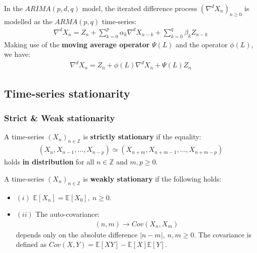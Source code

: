 \begin{definition}
    In the $ARIMA(p, d, q)$ model, the iterated difference process $(\nabla^dX_n)_{n\ge0}$ is modelled as the $ARMA(p, q)$ time-series:
    \begin{align*}
    \boxed{
        \nabla^d X_n = Z_n + \sum_{k=0}^p \alpha_k \nabla^dX_{n-k} + \sum_{k=0}^q \beta_k Z_{n-k}
    }
    \end{align*}
    \noindent Making use of the \textbf{moving average operator} $\Psi(L)$ and the operator $\phi(L)$, we have:
    \begin{align*}
        \boxed{
            \nabla^d X_n = Z_n + \phi(L)\nabla^dX_n + \Psi(L) Z_n
        }
    \end{align*}
\end{definition}

\subsection{Time-series stationarity}
\subsubsection{Strict \& Weak stationarity}
\begin{definition}
    A time-series $(X_n)_{n\in\mathbb{Z}}$ is \textbf{strictly stationary} if the equality:
    \begin{align*}
        (X_n, X_{n-1}, \dots, X_{n-p}) \simeq (X_{n+m}, X_{n+m-1}, \dots, X_{n+m-p})
    \end{align*}
    \noindent holds \textbf{in distribution} for all $n \in \mathbb{Z}$ and $m, p \ge 0$.
\end{definition}

\begin{definition}
    A time-series $(X_n)_{n\in\mathbb{Z}}$ is \textbf{weakly stationary} if the following holds:
    \begin{itemize}
        \item $(i)$ $\mathbb{E}[X_n] = \mathbb{E}[X_0], \ n\ge0$.
        \item $(ii)$ The auto-covariance:
        \begin{align*}
            (n, m) \to Cov(X_n, X_m)
        \end{align*}
        \noindent depends only on the absolute difference $|n-m|, \ n, m \ge0$. The covariance is defined as $Cov(X, Y) = \mathbb{E}[XY] - \mathbb{E}[X]\mathbb{E}[Y]$.
    \end{itemize}
\end{definition}

